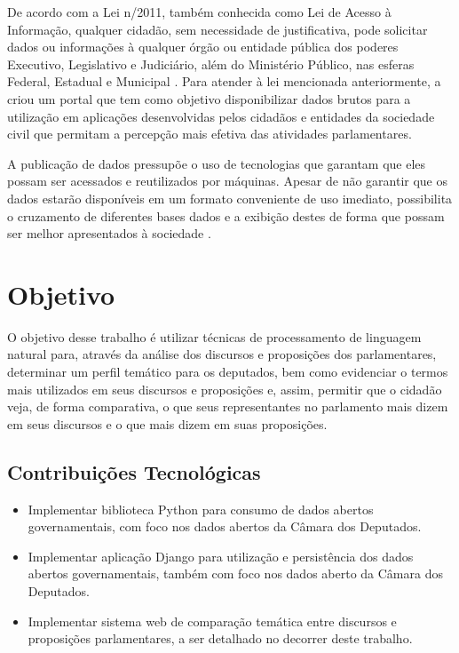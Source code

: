 De acordo com a Lei n/2011, também conhecida como Lei de Acesso à Informação, qualquer cidadão, sem necessidade de justificativa, pode solicitar dados ou informações à qualquer órgão ou entidade pública dos poderes Executivo, Legislativo e Judiciário, além do Ministério Público, nas esferas Federal, Estadual e Municipal \cite{lei_acesso_informacao}. Para atender à lei mencionada anteriormente, a  criou um portal que tem como objetivo disponibilizar dados brutos para a utilização em aplicações desenvolvidas pelos cidadãos e entidades da sociedade civil que permitam a percepção mais efetiva das atividades parlamentares.

A publicação de dados pressupõe o uso de tecnologias que garantam que eles possam ser acessados e reutilizados por máquinas. Apesar de não garantir que os dados estarão disponíveis em um formato conveniente de uso imediato, possibilita o cruzamento de diferentes bases dados e a exibição destes de forma que possam ser melhor apresentados à sociedade \cite{diniz2010}.

\section{Objetivo}
\label{sec:objetivo}

O objetivo desse trabalho é utilizar técnicas de processamento de linguagem natural para, através da análise dos discursos e proposições dos parlamentares, determinar um perfil temático para os deputados, bem como evidenciar o termos mais utilizados em seus discursos e proposições e, assim, permitir que o cidadão veja, de forma comparativa, o que seus representantes no parlamento mais dizem em seus discursos e o que mais dizem em suas proposições.

\subsection{Contribuições Tecnológicas}
\label{sub:contribuicoes_tecnologicas}

\begin{itemize}
    \item Implementar biblioteca Python para consumo de dados abertos governamentais, com foco nos dados abertos da Câmara dos Deputados.
    \item Implementar aplicação Django para utilização e persistência dos dados abertos governamentais, também com foco nos dados aberto da Câmara dos Deputados.
    \item Implementar sistema web de comparação temática entre discursos e proposições parlamentares, a ser detalhado no decorrer deste trabalho.
\end{itemize}

